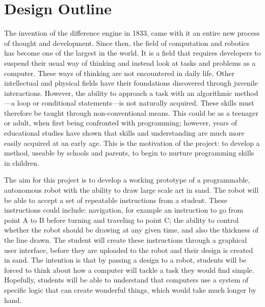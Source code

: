 \chapter{Design Outline}\label{design outline}\label{section \thechapter}

\label{outline aims and motivations}
The invention of the difference engine in 1833, came with it an entire new process of thought and development. Since then, the field of computation and robotics has become one of the largest in the world. It is a field that requires developers to suspend their usual way of thinking and instead look at tasks and problems as a computer. These ways of thinking are not encountered in daily life. Other intellectual and physical fields have their foundations discovered through juvenile interactions. However, the ability to approach a task with an algorithmic method---a loop or conditional statements---is not naturally acquired. These skills must therefore be taught through non-conventional means. This could be as a teenager or adult, when first being confronted with programming; however, years of educational studies have shown that skills and understanding are much more easily acquired at an early age. This is the motivation of the \SandE project: to develop a method, useable by schools and parents, to begin to nurture programming skills in children.

The aim for this project is to develop a working prototype of a programmable, autonomous robot with the ability to draw large scale art in sand. The robot will be able to accept a set of repeatable instructions from a student. These instructions could include: navigation, for example an instruction to go from point A to B before turning and traveling to point C; the ability to control whether the robot should be drawing at any given time, and also the thickness of the line drawn. The student will create these instructions through a graphical user interface, before they are uploaded to the robot and their design is created in sand. The intention is that by passing a design to a robot, students will be forced to think about how a computer will tackle a task they would find simple. Hopefully, students will be able to understand that computers use a system of specific logic that can create wonderful things, which would take much longer by hand.



